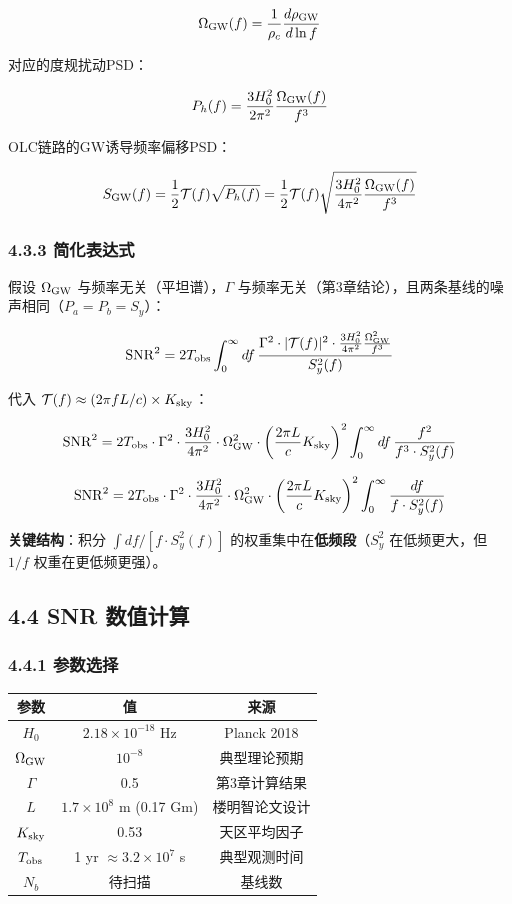 \documentclass[12pt,a4paper]{article}
\begin{document}
$$\Omega_{\rm GW}(f) = \frac{1}{\rho_c} \frac{d\rho_{\rm GW}}{d\ln f}$$

对应的度规扰动PSD：

$$P_h(f) = \frac{3H_0^2}{2\pi^2} \frac{\Omega_{\rm GW}(f)}{f^3}$$

OLC链路的GW诱导频率偏移PSD：

$$S_{\rm GW}(f) = \frac{1}{2} \mathcal{T}(f) \sqrt{P_h(f)} = \frac{1}{2} \mathcal{T}(f) \sqrt{\frac{3H_0^2}{4\pi^2} \frac{\Omega_{\rm GW}(f)}{f^3}}$$

\subsubsection{4.3.3 简化表达式}


假设 $\Omega_{\rm GW}$ 与频率无关（平坦谱），$\Gamma$ 与频率无关（第3章结论），且两条基线的噪声相同（$P_a = P_b = S_y$）：

$${\rm SNR}^2 = 2 T_{\rm obs} \int_0^\infty df\, \frac{\Gamma^2 \cdot |\mathcal{T}(f)|^2 \cdot \frac{3H_0^2}{4\pi^2} \frac{\Omega_{\rm GW}^2}{f^3}}{S_y^2(f)}$$

代入 $\mathcal{T}(f) \approx (2\pi f L/c) \times K_{\rm sky}$：

$${\rm SNR}^2 = 2 T_{\rm obs} \cdot \Gamma^2 \cdot \frac{3H_0^2}{4\pi^2} \cdot \Omega_{\rm GW}^2 \cdot \left(\frac{2\pi L}{c} K_{\rm sky}\right)^2 \int_0^\infty df\, \frac{f^2}{f^3 \cdot S_y^2(f)}$$

$${\rm SNR}^2 = 2 T_{\rm obs} \cdot \Gamma^2 \cdot \frac{3H_0^2}{4\pi^2} \cdot \Omega_{\rm GW}^2 \cdot \left(\frac{2\pi L}{c} K_{\rm sky}\right)^2 \int_0^\infty \frac{df}{f \cdot S_y^2(f)}$$

\textbf{关键结构}：积分 $\int df / [f \cdot S_y^2(f)]$ 的权重集中在\textbf{低频段}（$S_y^2$ 在低频更大，但 $1/f$ 权重在更低频更强）。

\subsection{4.4 SNR 数值计算}


\subsubsection{4.4.1 参数选择}


\begin{tabular}{|c|c|c|}
\hline
参数 & 值 & 来源 \\
\hline
$H_0$ & $2.18 \times 10^{-18}$ Hz & Planck 2018 \\
$\Omega_{\rm GW}$ & $10^{-8}$ & 典型理论预期 \\
$\Gamma$ & 0.5 & 第3章计算结果 \\
$L$ & $1.7 \times 10^8$ m (0.17 Gm) & 楼明智论文设计 \\
$K_{\rm sky}$ & 0.53 & 天区平均因子 \\
$T_{\rm obs}$ & 1 yr $\approx 3.2 \times 10^7$ s & 典型观测时间 \\
$N_b$ & 待扫描 & 基线数 \\
\hline
\end{tabular}
\end{document}
